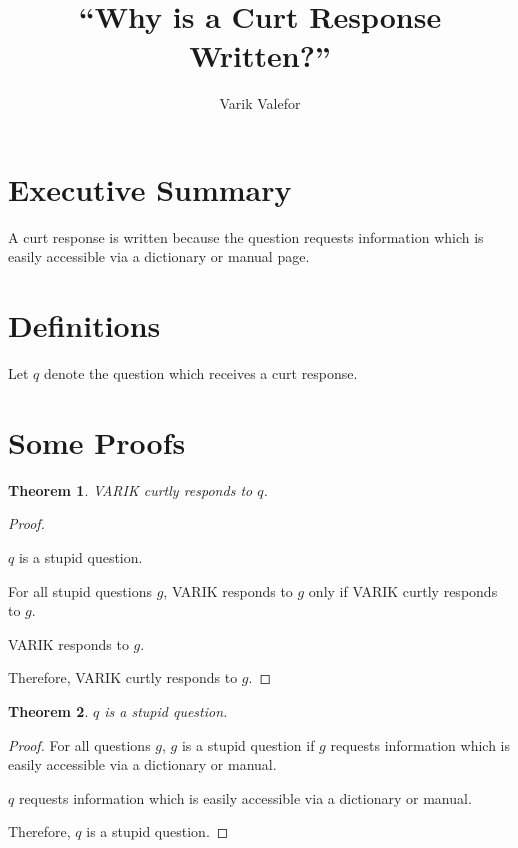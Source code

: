 \documentclass{article}
\title{``Why is a Curt Response Written?''}
\author{Varik Valefor}
\begin{document}
\newtheorem{thm}{Theorem}
\maketitle

\section{Executive Summary}
A curt response is written because the question requests information which is easily accessible via a dictionary or manual page.

\section{Definitions}
Let $q$ denote the question which receives a curt response.

\section{Some Proofs}
\begin{thm}
        VARIK curtly responds to $q$.
\end{thm}
\begin{proof}
        ${}$

        $q$ is a stupid question.

        For all stupid questions $g$, VARIK responds to $g$ only if VARIK curtly responds to $g$.

        VARIK responds to $g$.

        Therefore, VARIK curtly responds to $g$.
\end{proof}

\begin{thm}
        $q$ is a stupid question.
\end{thm}
\begin{proof}
        For all questions $g$, $g$ is a stupid question if $g$ requests information which is easily accessible via a dictionary or manual.

        $q$ requests information which is easily accessible via a dictionary or manual.

        Therefore, $q$ is a stupid question.
\end{proof}
\end{document}
